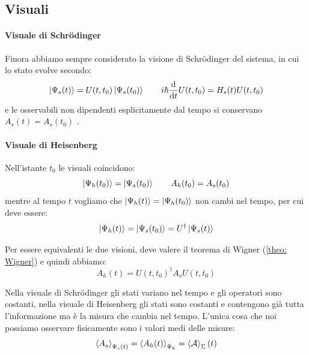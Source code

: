 
\subsection{Visuali}

\paragraph{Visuale di Schrödinger}Finora abbiamo sempre considerato la visione di Schrödinger del sistema, in cui lo stato evolve secondo:
\begin{equation}
    \ket{\Psi_s(t)} = U(t, t_0) \ket{\Psi_s(t_0)} \qquad i\hbar \dv{t}U(t, t_0)= H _s(t) U (t, t_0)
\end{equation}
e le osservabili non dipendenti esplicitamente dal tempo si conservano \(A_s(t)= A_s(t_0)\) .

\paragraph{Visuale di Heisenberg} Nell'istante \(t_0\) le visuali coincidono:
\[
    \ket{\Psi_h(t_0)} = \ket{\Psi_s(t_0)}   \qquad A_h(t_0)  = A_s(t_0)
\]
mentre al tempo \(t\) vogliamo che \(\ket{\Psi_h(t)}  = \ket{\Psi_h(t_0)}\) non cambi nel tempo, per cui deve essere:
\begin{equation}
    \ket{\Psi_h(t)}  = \ket{\Psi_s(t_0)} = U^\dagger \ket{\Psi_s(t)}
\end{equation}

Per essere equivalenti le due visioni, deve valere il teorema di Wigner (\ref{theo: Wigner}) e quindi abbiamo:
\begin{equation}
    A_h(t)= U(t,t_0)^\dagger A_s U (t, t_0)
\end{equation}

Nella visuale di Schrödinger gli stati variano nel tempo e gli operatori sono costanti, nella visuale di Heisenberg gli stati sono costanti e contengono già tutta l'informazione ma è la misura che cambia nel tempo.
L'unica cosa che noi possiamo osservare fisicamente sono i valori medi delle misure:
\begin{equation}
    \expval{A_s}_{\Psi_s(t)}  = \expval{A_h(t)}_{\Psi_h} = \expval{\mathcal{A}}_\Sigma(t)    
\end{equation}


